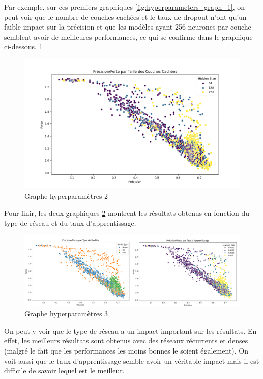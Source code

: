 \documentclass{article}
\begin{document}
Par exemple, sur ces premiers graphiques \ref{fig:hyperparameters_graph_1}, on peut voir que le nombre de couches cachées et le taux de dropout n'ont qu'un faible impact sur la précision et que les modèles ayant 256 neurones par couche semblent avoir de meilleures performances, ce qui se confirme dans le graphique ci-dessous. \ref{fig:hyperparameters_graph_2}

\begin{figure}[h!]
    \centering
    \includegraphics[width=\textwidth]{img/hyperparameters_graph_2.png}
    \caption{Graphe hyperparamètres 2}
    \label{fig:hyperparameters_graph_2}
\end{figure}

\newpage


Pour finir, les deux graphiques \ref{fig:hyperparameters_graph_3} montrent les résultats obtenus en fonction du type de réseau et du taux d'apprentissage.

\begin{figure}[h!]
    \centering
    \includegraphics[width=\textwidth]{img/hyperparameters_graph_3.png}
    \caption{Graphe hyperparamètres 3}
    \label{fig:hyperparameters_graph_3}
\end{figure}

On peut y voir que le type de réseau a un impact important sur les résultats. En effet, les meilleurs résultats sont obtenus avec des réseaux récurrents et denses (malgré le fait que les performances les moins bonnes le soient également). On voit aussi que le taux d'apprentissage semble avoir un véritable impact mais il est difficile de savoir lequel est le meilleur.
\end{document}

